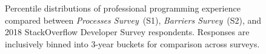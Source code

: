 \begin{figure}[!htbp]
\centering
{}
\caption{Percentile distributions of professional programming experience compared between \textit{Processes Survey}~(S1), \textit{Barriers Survey}~(S2), and 2018 StackOverflow Developer Survey respondents. Responses are inclusively binned into 3-year buckets for comparison across surveys.}
\label{populations}
\end{figure}